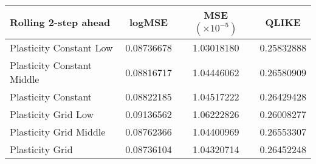 
\begin{tabular}{l|c|c|c}
Rolling 2-step ahead     & logMSE & MSE $(\times 10^{-5})$ & QLIKE \\\hline
Plasticity Constant Low & 0.08736678 & 1.03018180 & 0.25832888\\ 
Plasticity Constant Middle & 0.08816717 & 1.04446062 & 0.26580909\\ 
Plasticity Constant & 0.08822185 & 1.04517222 & 0.26429428\\ 
Plasticity Grid Low & 0.09136562 & 1.06222826 & 0.26008277\\ 
Plasticity Grid Middle & 0.08762366 & 1.04400969 & 0.26553307\\ 
Plasticity Grid & 0.08736104 & 1.04320714 & 0.26452248\\ 
\end{tabular}
